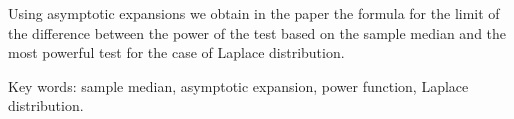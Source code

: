 Using asymptotic expansions we obtain in the paper the formula for the limit of the difference between
the power of the test based on the sample median and the most powerful test for the case of Laplace distribution.

Key words: sample median, asymptotic expansion, power function, Laplace distribution.